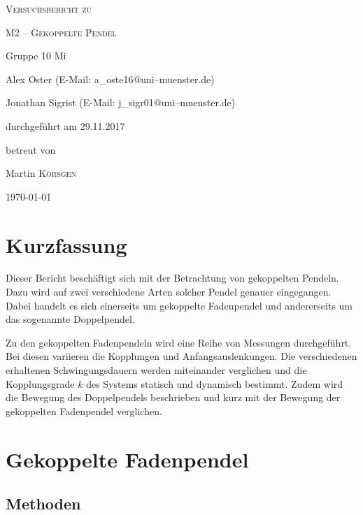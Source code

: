 \documentclass[11pt,a4paper,titlepage, ngerman]{article}
\begin{document}
	\begin{titlepage}
		\centering
		{\scshape\LARGE Versuchsbericht zu \par}
		\vspace{1cm}
		{\scshape\huge M2 -- Gekoppelte Pendel\par}
		\vspace{2.5cm}
		{\LARGE Gruppe 10 Mi\par}
		\vspace{0.5cm}
		{\large Alex Oster (E-Mail: a\_oste16@uni--muenster.de) \par}
		{\large Jonathan Sigrist (E-Mail: j\_sigr01@uni--muenster.de) \par}
		\vfill
		durchgeführt am 29.11.2017\par
		betreut von\par
		{\large Martin \textsc{Körsgen}}		
		\vfill	
		{\large \today\par}
	\end{titlepage}
		
	\tableofcontents
		
	\newpage
	
	\section{Kurzfassung}
		
		Dieser Bericht beschäftigt sich mit der Betrachtung von gekoppelten Pendeln. Dazu wird auf zwei verschiedene Arten solcher Pendel genauer eingegangen. Dabei handelt es sich einerseits um gekoppelte Fadenpendel und andererseits um das sogenannte Doppelpendel. 
		
		Zu den gekoppelten Fadenpendeln wird eine Reihe von Messungen durchgeführt. Bei diesen variieren die Kopplungen und Anfangsauslenkungen. Die verschiedenen erhaltenen Schwingungsdauern werden miteinander verglichen und die Kopplungsgrade $k$ des Systems statisch und dynamisch bestimmt. Zudem wird die Bewegung des Doppelpendels beschrieben und kurz mit der Bewegung der gekoppelten Fadenpendel verglichen.
		
	\section{Gekoppelte Fadenpendel}
		
		\subsection{Methoden}
			
\end{document}
